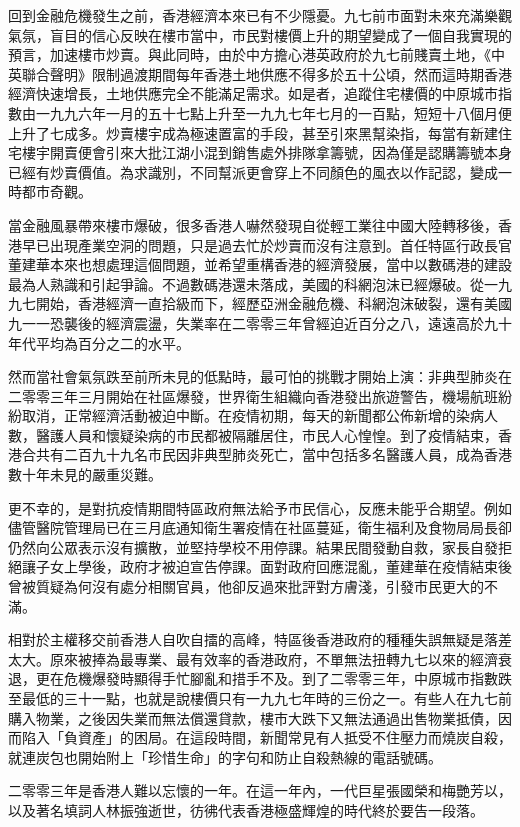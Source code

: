 回到金融危機發生之前，香港經濟本來已有不少隱憂。九七前市面對未來充滿樂觀氣氛，盲目的信心反映在樓市當中，市民對樓價上升的期望變成了一個自我實現的預言，加速樓市炒賣。與此同時，由於中方擔心港英政府於九七前賤賣土地，《中英聯合聲明》限制過渡期間每年香港土地供應不得多於五十公頃，然而這時期香港經濟快速增長，土地供應完全不能滿足需求。如是者，追蹤住宅樓價的中原城市指數由一九九六年一月的五十七點上升至一九九七年七月的一百點，短短十八個月便上升了七成多。炒賣樓宇成為極速置富的手段，甚至引來黑幫染指，每當有新建住宅樓宇開賣便會引來大批江湖小混到銷售處外排隊拿籌號，因為僅是認購籌號本身已經有炒賣價值。為求識別，不同幫派更會穿上不同顏色的風衣以作記認，變成一時都市奇觀。

當金融風暴帶來樓市爆破，很多香港人嚇然發現自從輕工業往中國大陸轉移後，香港早已出現產業空洞的問題，只是過去忙於炒賣而沒有注意到。首任特區行政長官董建華本來也想處理這個問題，並希望重構香港的經濟發展，當中以數碼港的建設最為人熟識和引起爭論。不過數碼港還未落成，美國的科網泡沫已經爆破。從一九九七開始，香港經濟一直拾級而下，經歷亞洲金融危機、科網泡沫破裂，還有美國九一一恐襲後的經濟震盪，失業率在二零零三年曾經迫近百分之八，遠遠高於九十年代平均為百分之二的水平。

然而當社會氣氛跌至前所未見的低點時，最可怕的挑戰才開始上演：非典型肺炎在二零零三年三月開始在社區爆發，世界衛生組織向香港發出旅遊警告，機場航班紛紛取消，正常經濟活動被迫中斷。在疫情初期，每天的新聞都公佈新增的染病人數，醫護人員和懷疑染病的市民都被隔離居住，市民人心惶惶。到了疫情結束，香港合共有二百九十九名市民因非典型肺炎死亡，當中包括多名醫護人員，成為香港數十年未見的嚴重災難。

更不幸的，是對抗疫情期間特區政府無法給予市民信心，反應未能乎合期望。例如儘管醫院管理局已在三月底通知衛生署疫情在社區蔓延，衛生福利及食物局局長卻仍然向公眾表示沒有擴散，並堅持學校不用停課。結果民間發動自救，家長自發拒絕讓子女上學後，政府才被迫宣告停課。面對政府回應混亂，董建華在疫情結束後曾被質疑為何沒有處分相關官員，他卻反過來批評對方膚淺，引發市民更大的不滿。

相對於主權移交前香港人自吹自擂的高峰，特區後香港政府的種種失誤無疑是落差太大。原來被捧為最專業、最有效率的香港政府，不單無法扭轉九七以來的經濟衰退，更在危機爆發時顯得手忙腳亂和措手不及。到了二零零三年，中原城市指數跌至最低的三十一點，也就是說樓價只有一九九七年時的三份之一。有些人在九七前購入物業，之後因失業而無法償還貸款，樓市大跌下又無法通過出售物業抵債，因而陷入「負資產」的困局。在這段時間，新聞常見有人抵受不住壓力而燒炭自殺，就連炭包也開始附上「珍惜生命」的字句和防止自殺熱線的電話號碼。

二零零三年是香港人難以忘懷的一年。在這一年內，一代巨星張國榮和梅艷芳以，以及著名填詞人林振強逝世，彷彿代表香港極盛輝煌的時代終於要告一段落。

